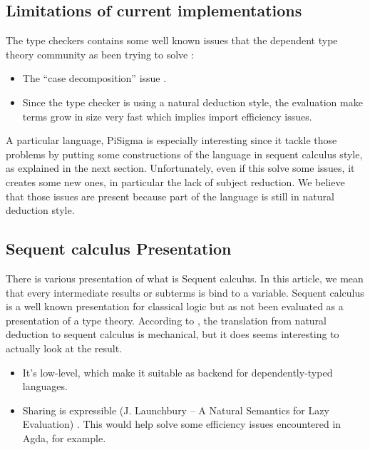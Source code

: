 \documentclass[11pt]{scrartcl}
\begin{document}
\subsection{Limitations of current implementations}
\label{sec:limitations}

The  type checkers contains some well known issues that the dependent type theory community as been trying to solve :
\begin{itemize}
\item The ``case decomposition'' issue .
\item Since the  type checker is using a natural deduction style, the evaluation make terms grow in size very fast which implies import efficiency issues.
\end{itemize}


A particular language, PiSigma  is especially interesting since it tackle those problems by putting some constructions of the language in sequent calculus style, as explained in the next section. Unfortunately, even if this solve some issues, it creates some new ones, in particular the lack of subject reduction. We believe that those issues are present because part of the language is still in natural deduction style.


\subsection{Sequent calculus Presentation}
\label{sec:seqcalculus}

There is various presentation of what is Sequent calculus. In this article, we mean that every intermediate results or subterms is bind to a variable.
Sequent calculus is a well known presentation for classical logic but as not been evaluated as a presentation of a type theory.
According to , the translation from natural deduction to sequent calculus is mechanical, but it does seems interesting to actually look at the result.
\begin{itemize}
\item It's low-level, which make it suitable as backend for dependently-typed languages.
\item Sharing is expressible (J. Launchbury -- A Natural Semantics for Lazy Evaluation) . This would help solve some efficiency issues encountered in Agda, for example.
\end{itemize}
\end{document}
